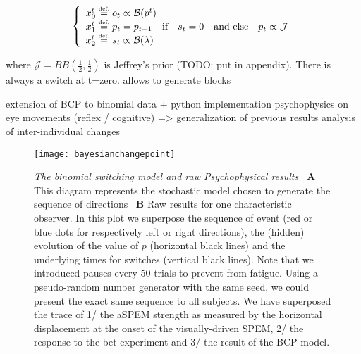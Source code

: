 \documentclass[profile,final,english, draft]{article}%
\newcommand{\choice}[1]{ %
	\left\{ %
		\begin{array}{l} #1 \end{array} %
	\right. }
\newcommand{\eqdef}{\ensuremath{\stackrel{\mbox{\upshape\tiny def.}}{=}}}
\newcommand{\eql}[1]{\begin{equation}#1\end{equation}}
\newcommand{\Bb}{\mathcal{B}}
\newcommand{\Jj}{\mathcal{J}}
\begin{document}
\eql{\choice{
x_0^t \eqdef o_t \propto \Bb(p^t) \\
x_1^t \eqdef p_t = p_{t-1} \quad \text{if} \quad s_t=0 \quad \text{and else} \quad p_t \propto \Jj \\
x_2^t \eqdef s_t \propto \Bb(\lambda)
}}

where $\Jj = BB(\frac 1 2 , \frac 1 2 )$ is Jeffrey's prior (TODO: put in appendix). There is always a switch at t=zero.
allows to generate blocks

%
%
%




extension of BCP to binomial data + python implementation
psychophysics on eye movements (reflex / cognitive) => generalization of previous results
analysis of inter-individual changes



\begin{figure}%
\begin{center}
    \texttt{[image: bayesianchangepoint]}
\end{center}
\caption{\emph{The binomial switching model and raw Psychophysical results}%
~\textbf{A} This diagram represents the stochastic model chosen to generate the sequence of directions %
~\textbf{B} Raw results for one characteristic observer. In this plot we superpose the sequence of event (red or blue dots for respectively left or right directions), the (hidden) evolution of the value of $p$ (horizontal black lines) and the underlying times for switches (vertical black lines). Note that we introduced pauses every 50 trials to prevent from fatigue. Using a pseudo-random number generator with the same seed, we could present the exact same sequence to all subjects. %
We have superposed the trace of 1/ the aSPEM strength as measured by the horizontal displacement at the onset of the visually-driven SPEM, 2/ the response to the bet experiment and 3/ the result of the BCP model.
}
\label{fig:results_psycho}
\end{figure}
%
\end{document}
